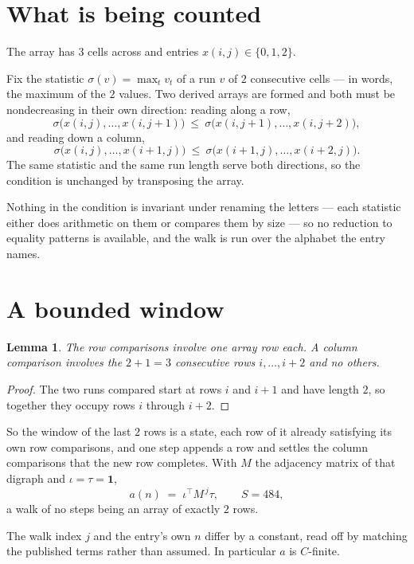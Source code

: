 \documentclass[11pt,a4paper]{article}
\theoremstyle{plain}
\newtheorem{lemma}[theorem]{Lemma}
\theoremstyle{definition}
\begin{document}
\section{What is being counted}

The array has $3$ cells across and entries $x(i,j)\in\{0,1,2\}$.

Fix the statistic $\sigma(v)=\max_t v_t$ of a run $v$ of $2$ consecutive cells --- in words,
the maximum of the $2$ values. Two derived arrays are formed and both must be
nondecreasing in their own direction: reading along a row,
\[
\sigma\bigl(x(i,j),\dots,x(i,j{+}1)\bigr)\ \le\
\sigma\bigl(x(i,j{+}1),\dots,x(i,j{+}2)\bigr),
\]
and reading down a column,
\[
\sigma\bigl(x(i,j),\dots,x(i{+}1,j)\bigr)\ \le\
\sigma\bigl(x(i{+}1,j),\dots,x(i{+}2,j)\bigr).
\]
The same statistic and the same run length serve both directions, so the condition is
unchanged by transposing the array.

Nothing in the condition is invariant under renaming the letters --- each statistic either does
arithmetic on them or compares them by size --- so no reduction to equality patterns is
available, and the walk is run over the alphabet the entry names.

\section{A bounded window}

\begin{lemma}\label{lem:win}
The row comparisons involve one array row each. A column comparison involves the
$2+1=3$ consecutive rows $i,\dots,i{+}2$ and no others.
\end{lemma}

\begin{proof}
The two runs compared start at rows $i$ and $i+1$ and have length $2$, so together they
occupy rows $i$ through $i+2$.
\end{proof}

So the window of the last $2$ rows is a state, each row of it already satisfying its own row
comparisons, and one step appends a row and settles the column comparisons that the new row
completes. With $M$ the adjacency matrix of that digraph and $\iota=\tau=\mathbf{1}$,
\[
a(n)\;=\;\iota^{\!\top}M^{\,j}\tau ,\qquad S=484,
\]
a walk of no steps being an array of exactly $2$ rows.

The walk index $j$ and the entry's own $n$ differ by a constant, read off by matching the
published terms rather than assumed. In particular $a$ is $C$-finite.
\end{document}
